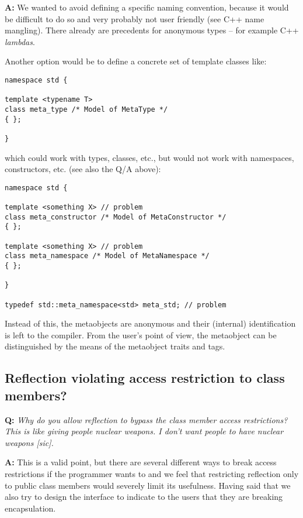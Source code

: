 \textbf{A:} We wanted to avoid defining a specific naming convention, because it would
be difficult to do so and very probably not user friendly (see C++ name mangling). There
already are precedents for anonymous types -- for example C++ {\em lambdas}.

Another option would be to define a concrete set of template classes like:

\begin{verbatim}
namespace std {

template <typename T>
class meta_type /* Model of MetaType */
{ };

}
\end{verbatim}

which could work with types, classes, etc., but would not work with namespaces,
constructors, etc. (see also the Q/A above):

\begin{verbatim}
namespace std {

template <something X> // problem
class meta_constructor /* Model of MetaConstructor */
{ };

template <something X> // problem
class meta_namespace /* Model of MetaNamespace */
{ };

}

typedef std::meta_namespace<std> meta_std; // problem
\end{verbatim}

Instead of this, the metaobjects are anonymous and their (internal) identification
is left to the compiler. From the user's point of view, the metaobject can be distinguished
by the means of the metaobject traits and tags.

\subsection{Reflection violating access restriction to class members?}

\textbf{Q:} {\em Why do you allow reflection to bypass the class member access
restrictions? This is like giving people nuclear weapons. I don't want people
to have nuclear weapons [sic].}

\textbf{A:}
This is a valid point, but there are several different ways to break access restrictions
if the programmer wants to and we feel that restricting reflection only to public
class members would severely limit its usefulness. Having said that we also
try to design the interface to indicate to the users that they are breaking
encapsulation.

